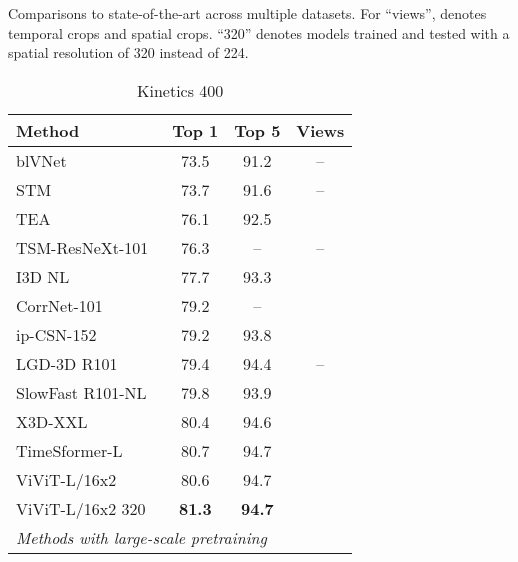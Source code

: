 \documentclass[10pt,twocolumn,letterpaper]{article}
\begin{document}
\begin{table*}[tb]
	\caption{Comparisons to state-of-the-art across multiple datasets. For ``views'',  denotes  temporal crops and  spatial crops.
	``320'' denotes models trained and tested with a spatial resolution of 320 instead of 224.
	}
	\vspace{0.2\baselineskip}
	\begin{subtable}[t]{.32\linewidth}
		\centering
		\caption{Kinetics 400}
    	\setlength{\tabcolsep}{4pt} \renewcommand*{\arraystretch}{1.11}  

		\vspace{-0.3\baselineskip}
		\scriptsize{
			\begin{tabular}{lccc}
				\toprule
				Method 																			 & Top 1                & Top 5         & Views \\
				\midrule
				blVNet~\cite{fan_blvnet_neurips_2019}							  & 73.5 				  & 91.2  & -- \\ 
				STM~\cite{jiang_stm_iccv_2019}										& 73.7 					& 91.6	& -- \\
				TEA~\cite{li_tea_cvpr_2020}												& 76.1					& 92.5 &  \\
				TSM-ResNeXt-101~\cite{lin_tsm_cvpr_2019}						  & 76.3				 & -- &  -- \\
				I3D NL~\cite{wang_cvpr_2018}										 & 77.7                  & 93.3         		 &       \\
				CorrNet-101~\cite{wang_corrnet_cvpr_2020}					  & 79.2				 & --			 		 & 		 \\
				ip-CSN-152~\cite{tran_iccv_2019}									&  79.2					& 93.8				& 		 \\
				LGD-3D R101~\cite{qiu_lgd_cvpr_2019}							&  79.4				    & 94.4			 		&  --						\\  
				SlowFast R101-NL~\cite{feichtenhofer_iccv_2019}       		&  79.8                 &  93.9                   &        \\
				X3D-XXL~\cite{feichtenhofer_cvpr_2020}      					&  80.4					&  94.6			  		&        \\
				TimeSformer-L~\cite{bertasius_arxiv_2021}					  & 80.7				& 94.7					&  \\
				ViViT-L/16x2 														 & 80.6	 & 94.7			  &     \\  ViViT-L/16x2  320 												  &  \textbf{81.3}    &    \textbf{94.7}  &  \\  \midrule
				\multicolumn{4}{l}{\textit{Methods with large-scale pretraining}}                                \\ 

\end{tabular}}
\end{subtable}
\end{table*}
\end{document}
